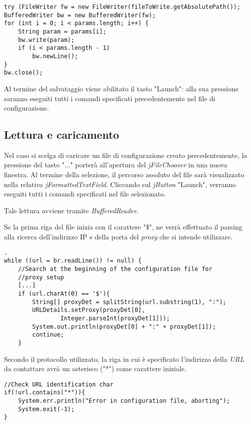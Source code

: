 \vspace{0.5cm}
\begin{lstlisting}
try (FileWriter fw = new FileWriter(fileToWrite.getAbsolutePath()); 
BufferedWriter bw = new BufferedWriter(fw);
for (int i = 0; i < params.length; i++) {
	String param = params[i];
	bw.write(param);
	if (i < params.length - 1)
		bw.newLine();
} 
bw.close();     
\end{lstlisting}

Al termine del salvataggio viene abilitato il tasto "Launch": alla sua pressione saranno eseguiti tutti i comandi specificati precedentemente nel file di configurazione.

\subsection{Lettura e caricamento}
Nel caso si scelga di caricare un file di configurazione creato precedentemente, la pressione del tasto "..." porter\`{a} all'apertura del \textit{jFileChooser} in una nuova finestra.
Al termine della selezione, il percorso assoluto del file sar\`{a} visualizzato nella relativa \textit{jFormattedTextField}. 
Cliccando sul \textit{jButton} "Launch", verranno eseguiti tutti i comandi specificati nel file selezionato.

Tale lettura avviene tramite \textit{BufferedReader}.

Se la prima riga del file inizia con il carattere "\$", ne verr\`{a} effettuato il parsing alla ricerca dell'indirizzo IP e della porta del \textit{proxy} che si intende utilizzare. 

\begin{lstlisting}.
while ((url = br.readLine()) != null) {
	//Search at the beginning of the configuration file for 
	//proxy setup
	[...]
	if (url.charAt(0) == '$'){
		String[] proxyDet = splitString(url.substring(1), ":");
		URLDetails.setProxy(proxyDet[0], 
				Integer.parseInt(proxyDet[1]));
		System.out.println(proxyDet[0] + ":" + proxyDet[1]);
		continue;
	}
\end{lstlisting}

Secondo il protocollo utilizzato, la riga in cui \`{e} specificato l'indirizzo della \textit{URL} da contattare avr\`{a} un asterisco ("*") come carattere iniziale.

\begin{lstlisting}
//Check URL identification char
if(!url.contains("*")){
	System.err.println("Error in configuration file, aborting");
	System.exit(-1);
}
\end{lstlisting}

